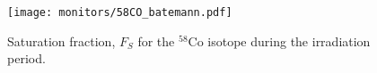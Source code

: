 \begin{figure}[htb]
\texttt{[image: monitors/58CO\_batemann.pdf]}
\caption{Saturation fraction, $F_S$ for the $^{58}$Co isotope during the irradiation period.
}
\label{fig:58CO_batemann}
\end{figure}

